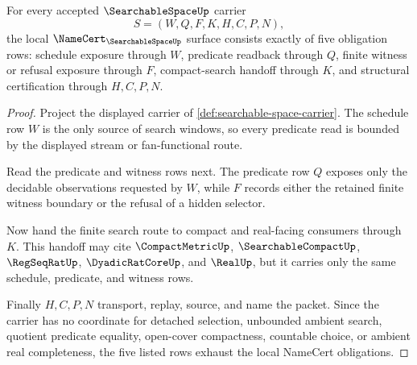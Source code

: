 \begin{theorem}
\label{thm:searchable-space-namecert-obligations}
For every accepted $\SearchableSpaceUp$ carrier
$$
S=(W,Q,F,K,H,C,P,N),
$$
the local $\NameCert_{\SearchableSpaceUp}$ surface consists exactly of five obligation rows: schedule exposure through $W$, predicate readback through $Q$, finite witness or refusal exposure through $F$, compact-search handoff through $K$, and structural certification through $H,C,P,N$.
\end{theorem}
\begin{proof}
Project the displayed carrier of \autoref{def:searchable-space-carrier}. The schedule row $W$ is the only source of search windows, so every predicate read is bounded by the displayed stream or fan-functional route.

Read the predicate and witness rows next. The predicate row $Q$ exposes only the decidable observations requested by $W$, while $F$ records either the retained finite witness boundary or the refusal of a hidden selector.

Now hand the finite search route to compact and real-facing consumers through $K$. This handoff may cite $\CompactMetricUp$, $\SearchableCompactUp$, $\RegSeqRatUp$, $\DyadicRatCoreUp$, and $\RealUp$, but it carries only the same schedule, predicate, and witness rows.

Finally $H,C,P,N$ transport, replay, source, and name the packet. Since the carrier has no coordinate for detached selection, unbounded ambient search, quotient predicate equality, open-cover compactness, countable choice, or ambient real completeness, the five listed rows exhaust the local NameCert obligations.
\end{proof}




